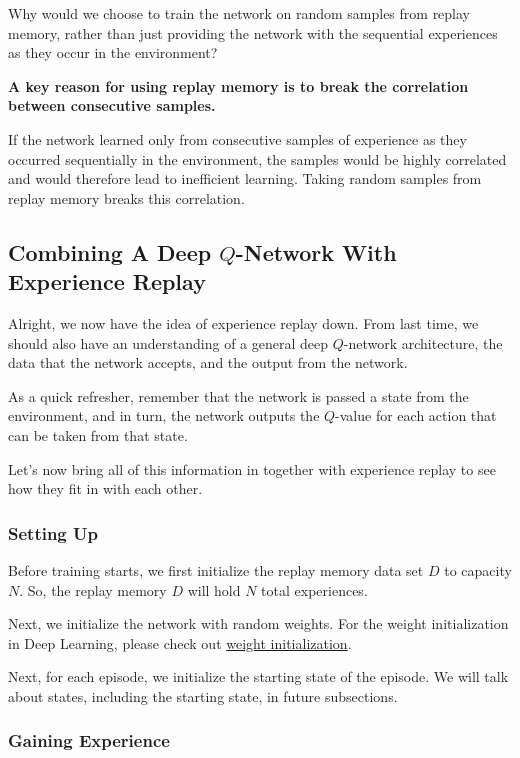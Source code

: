 Why would we choose to train the network on random samples from replay memory, rather 
than just providing the network with the sequential experiences as they occur in the 
environment?

\begin{emp_box}
{\bf A key reason for using replay memory is to break the correlation between consecutive 
samples.}
\end{emp_box}

If the network learned only from consecutive samples of experience as they occurred 
sequentially in the environment, the samples would be highly correlated and would 
therefore lead to inefficient learning. Taking random samples from replay memory breaks 
this correlation.


\subsection{Combining A Deep $Q$-Network With Experience Replay}

Alright, we now have the idea of experience replay down. From last time, we should also 
have an understanding of a general deep $Q$-network architecture, the data that the network 
accepts, and the output from the network.

As a quick refresher, remember that the network is passed a state from the environment, 
and in turn, the network outputs the $Q$-value for each action that can be taken from 
that state.

Let's now bring all of this information in together with experience replay to see how 
they fit in with each other.


\subsubsection{Setting Up}

Before training starts, we first initialize the replay memory data set $D$ to capacity 
$N$. So, the replay memory $D$ will hold $N$ total experiences.

Next, we initialize the network with random weights. For the weight initialization in 
Deep Learning, please check out \href{https://deeplizard.com/learn/video/8krd5qKVw-Q}{weight initialization}. 

Next, for each episode, we initialize the starting state of the episode. We will talk 
about states, including the starting state, in future subsections.


\subsubsection{Gaining Experience}

